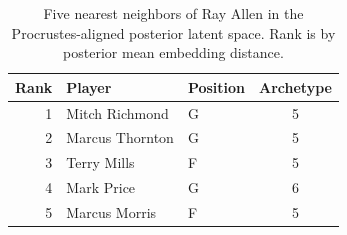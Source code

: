 \begin{table}[htbp]
  \centering\small
  \begin{tabular}{rllc}
    \toprule
    Rank & Player & Position & Archetype \\
    \midrule
    1 & Mitch Richmond & G & 5 \\
    2 & Marcus Thornton & G & 5 \\
    3 & Terry Mills & F & 5 \\
    4 & Mark Price & G & 6 \\
    5 & Marcus Morris & F & 5 \\
    \bottomrule
  \end{tabular}
  \caption{Five nearest neighbors of Ray Allen in the Procrustes-aligned posterior latent space. Rank is by posterior mean embedding distance.}
  \label{tab:Ray_Allen_neighbors}
\end{table}

